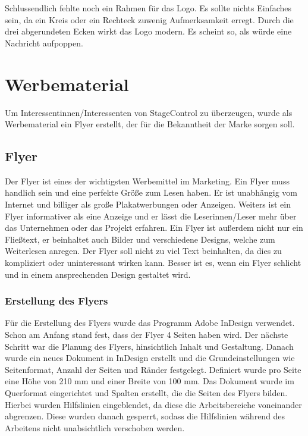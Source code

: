 Schlussendlich fehlte noch ein Rahmen für das Logo. Es sollte nichts Einfaches sein, da ein Kreis oder ein Rechteck zuwenig Aufmerksamkeit erregt. Durch die drei abgerundeten Ecken  wirkt das Logo modern. Es scheint so, als würde eine Nachricht aufpoppen. 

\section{Werbematerial}
Um Interessentinnen/Interessenten von StageControl zu überzeugen, wurde als Werbematerial ein Flyer erstellt, der für die Bekanntheit der Marke sorgen soll.

\subsection{Flyer}
Der Flyer ist eines der wichtigsten Werbemittel im Marketing. Ein Flyer muss handlich sein und eine perfekte Größe zum Lesen haben. Er ist unabhängig vom Internet und billiger als große Plakatwerbungen oder Anzeigen. Weiters ist ein Flyer informativer als eine Anzeige und er lässt die Leserinnen/Leser mehr über das Unternehmen oder das Projekt erfahren. Ein Flyer ist außerdem nicht nur ein Fließtext, er beinhaltet auch Bilder und verschiedene Designs, welche zum Weiterlesen anregen. Der Flyer soll nicht zu viel Text beinhalten, da dies zu kompliziert oder uninteressant wirken kann. Besser ist es, wenn ein Flyer schlicht und in einem ansprechenden Design gestaltet wird. \parencite{VorteilevonFlyern}

\newpage
\subsubsection{Erstellung des Flyers}
Für die Erstellung des Flyers wurde das Programm Adobe InDesign verwendet. Schon am Anfang stand fest, dass der Flyer 4 Seiten haben wird. Der nächste Schritt war die Planung des Flyers, hinsichtlich Inhalt und Gestaltung. Danach wurde ein neues Dokument in InDesign erstellt und die Grundeinstellungen wie Seitenformat, Anzahl der Seiten und Ränder festgelegt. Definiert wurde pro Seite eine Höhe von 210 mm und einer Breite von 100 mm. Das Dokument wurde im Querformat eingerichtet und Spalten erstellt, die die Seiten des Flyers bilden. Hierbei wurden Hilfslinien eingeblendet, da diese die Arbeitsbereiche voneinander abgrenzen. Diese wurden danach gesperrt, sodass die Hilfslinien während des Arbeitens nicht unabsichtlich verschoben werden. 

